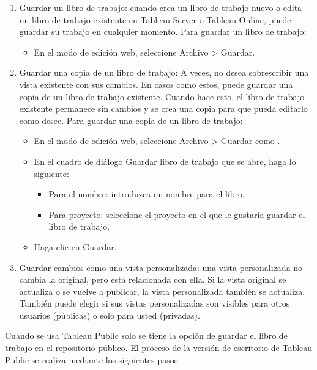 \documentclass[
]{book}
\providecommand{\tightlist}{%
  \setlength{\itemsep}{0pt}\setlength{\parskip}{0pt}}
\begin{document}
\begin{enumerate}
\def\labelenumi{\arabic{enumi}.}
\tightlist
\item
  Guardar un libro de trabajo: cuando crea un libro de trabajo nuevo o edita un libro de trabajo existente en Tableau Server o Tableau Online, puede guardar su trabajo en cualquier momento. Para guardar un libro de trabajo:

  \begin{itemize}
  \tightlist
  \item
    En el modo de edición web, seleccione Archivo \textgreater{} Guardar.
  \end{itemize}
\item
  Guardar una copia de un libro de trabajo: A veces, no desea sobrescribir una vista existente con sus cambios. En casos como estos, puede guardar una copia de un libro de trabajo existente. Cuando hace esto, el libro de trabajo existente permanece sin cambios y se crea una copia para que pueda editarlo como desee. Para guardar una copia de un libro de trabajo:

  \begin{itemize}
  \tightlist
  \item
    En el modo de edición web, seleccione Archivo \textgreater{} Guardar como .
  \item
    En el cuadro de diálogo Guardar libro de trabajo que se abre, haga lo
    siguiente:

    \begin{itemize}
    \tightlist
    \item
      Para el nombre: introduzca un nombre para el libro.
    \item
      Para proyecto: seleccione el proyecto en el que le gustaría guardar
      el libro de trabajo.
    \end{itemize}
  \item
    Haga clic en Guardar.
  \end{itemize}
\item
  Guardar cambios como una vista personalizada: una vista personalizada no cambia la original, pero está relacionada con ella. Si la vista original se actualiza o se vuelve a publicar, la vista personalizada también se actualiza. También puede elegir si sus vistas personalizadas son visibles para otros usuarios (públicas) o solo para usted (privadas).
\end{enumerate}

Cuando se usa Tableau Public solo se tiene la opción de guardar el libro de trabajo en el repositorio público. El proceso de la versión de escritorio de Tableau Public se realiza mediante los siguientes pasos:
\end{document}
